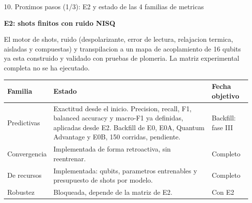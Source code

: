 \documentclass[aspectratio=169]{beamer}
\newcommand{\bmheading}[2]{\textbf{\color{#1}#2}\par\smallskip}
\newcommand{\bandedtable}{\rowcolors{2}{white}{bmRowAlt}}
\begin{document}
\begin{frame}{10. Proximos pasos (1/3): E2 y estado de las 4 familias de metricas}
  \begin{bluebox}
    \bmheading{bmBlue}{E2: shots finitos con ruido NISQ}
    El motor de shots, ruido (despolarizante, error de lectura, relajacion
    termica, aisladas y compuestas) y transpilacion a un mapa de acoplamiento
    de 16 qubits ya esta construido y validado con pruebas de plomeria. La
    matriz experimental completa no se ha ejecutado.
  \end{bluebox}

  \vspace{6pt}
  \scriptsize
  \bandedtable
  \begin{tabular}{@{}p{2.2cm}p{6.6cm}p{2.7cm}@{}}
    \toprule
    \textbf{Familia} & \textbf{Estado} & \textbf{Fecha objetivo} \\
    \midrule
    Predictivas & Exactitud desde el inicio. Precision, recall, F1, balanced
      accuracy y macro-F1 ya definidas, aplicadas desde E2. Backfill de E0,
      E0A, Quantum Advantage y E0B, 150 corridas, pendiente. &
      Backfill: fase III \\
    Convergencia & Implementada de forma retroactiva, sin reentrenar. &
      Completo \\
    De recursos & Implementada: qubits, parametros entrenables y presupuesto
      de shots por modelo. & Completo \\
    Robustez & Bloqueada, depende de la matriz de E2. & Con E2 \\
    \bottomrule
  \end{tabular}
\end{frame}
\end{document}
